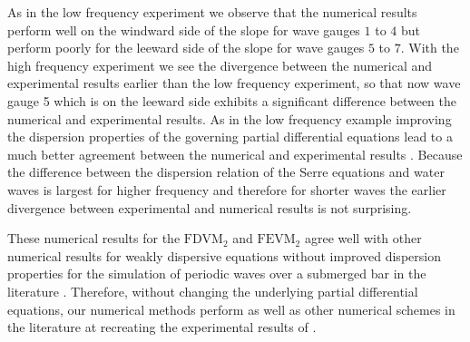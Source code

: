 As in the low frequency experiment we observe that the numerical results perform well on the windward side of the slope for wave gauges $1$ to $4$ but perform poorly for the leeward side of the slope for wave gauges $5$ to $7$. With the high frequency experiment we see the divergence between the numerical and experimental results earlier than the low frequency experiment, so that now wave gauge 5 which is on the leeward side exhibits a significant difference between the numerical and experimental results. As in the low frequency example improving the dispersion properties of the governing partial differential equations lead to a much better agreement between the numerical and experimental results \cite{Beji-Battjes-1994-1,Lannes-2013}. Because the difference between the dispersion relation of the Serre equations and water waves is largest for higher frequency and therefore for shorter waves \cite{Barthelemy-2004-315} the earlier divergence between experimental and numerical results is not surprising. 

These numerical results for the $\text{FDVM}_2$ and $\text{FEVM}_2$ agree well with other numerical results for weakly dispersive equations without improved dispersion properties for the simulation of periodic waves over a submerged bar in the literature \cite{Beji-Battjes-1994-1,Lannes-2013,Li-2014-169,Zhang-2013-13}. Therefore, without changing the underlying partial differential equations, our numerical methods perform as well as other numerical schemes in the literature at recreating the experimental results of \citet{Beji-Battjes-1994-1}.


